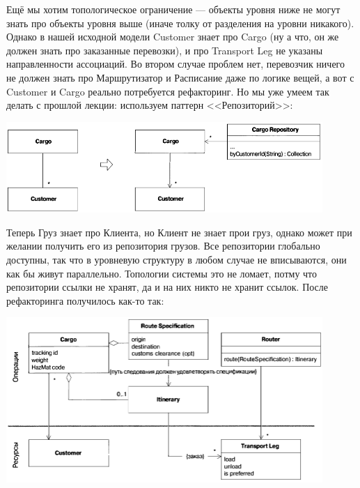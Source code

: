 \documentclass[a5paper]{article}
\begin{document}
Ещё мы хотим топологическое ограничение --- объекты уровня ниже не могут знать про объекты уровня выше (иначе толку от разделения на уровни никакого). Однако в нашей исходной модели Customer знает про Cargo (ну а что, он же должен знать про заказанные перевозки), и про Transport Leg не указаны направленности ассоциаций. Во втором случае проблем нет, перевозчик ничего не должен знать про Маршрутизатор и Расписание даже по логике вещей, а вот с Customer и Cargo реально потребуется рефакторинг. Но мы уже умеем так делать с прошлой лекции: используем паттерн <<Репозиторий>>: 

\begin{center}
    \includegraphics[width=0.9\textwidth]{cargoTwoLayersRefactoring.png}
\end{center}

Теперь Груз знает про Клиента, но Клиент не знает прои груз, однако может при желании получить его из репозитория грузов. Все репозитории глобально доступны, так что в уровневую структуру в любом случае не вписываются, они как бы живут параллельно. Топологии системы это не ломает, потму что репозитории ссылки не хранят, да и на них никто не хранит ссылок. После рефакторинга получилось как-то так:

\begin{center}
    \includegraphics[width=0.9\textwidth]{cargoTwoLayers.png}
\end{center}
\end{document}
